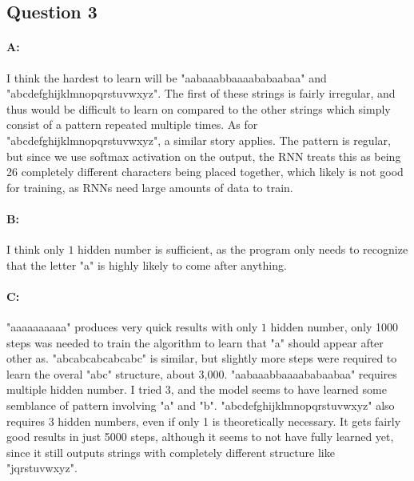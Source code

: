 \documentclass{article}
\begin{document}
\subsection{Question 3}

\paragraph{A: } I think the hardest to learn will be "aabaaabbaaaababaabaa" and "abcdefghijklmnopqrstuvwxyz". The first of these strings is fairly irregular, and thus would be difficult to learn on compared to the other strings which simply consist of a pattern repeated multiple times. As for "abcdefghijklmnopqrstuvwxyz", a similar story applies. The pattern is regular, but since we use softmax activation on the output, the RNN treats this as being 26 completely different characters being placed together, which likely is not good for training, as RNNs need large amounts of data to train.

\paragraph{B: } I think only $1$ hidden number is sufficient, as the program only needs to recognize that the letter "a" is highly likely to come after anything.

\paragraph{C: } "aaaaaaaaaa" produces very quick results with only $1$ hidden number, only 1000 steps was needed to train the algorithm to learn that "a" should appear after other as. \newline
"abcabcabcabcabc" is similar, but slightly more steps were required to learn the overal "abc" structure, about 3,000. \newline
"aabaaabbaaaababaabaa" requires multiple hidden number. I tried 3, and the model seems to have learned some semblance of pattern involving "a" and "b". \newline
"abcdefghijklmnopqrstuvwxyz" also requires 3 hidden numbers, even if only 1 is theoretically necessary. It gets fairly good results in just 5000 steps, although it seems to not have fully learned yet, since it still outputs strings with  completely different structure like "jqrstuvwxyz".
\end{document}

